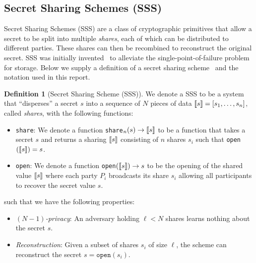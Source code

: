 \documentclass[11pt]{report}
\theoremstyle{definition}
\newtheorem{definition}{Definition}[section]
\theoremstyle{plain}
\begin{document}


\subsection{Secret Sharing Schemes (SSS)}

Secret Sharing Schemes (SSS) are a class of cryptographic primitives that allow a secret to be split into multiple \textit{shares}, each of which can be distributed to different parties. These shares can then be recombined to reconstruct the original secret. SSS was initially invented~\cite{shamir1979share} to alleviate the single-point-of-failure problem for storage. Below we supply a definition of a secret sharing scheme~\cite{cramer2015secure} and the notation used in this report.

\begin{definition}[Secret Sharing Scheme (SSS)]\label{def:ss-share}
  We denote a SSS to be a system that ``disperses'' a secret $s$ into a sequence of $N$ pieces of data $\llbracket s \rrbracket = [s_1, \dots, s_n]$, called \textit{shares}, with the following functions:
  \begin{itemize}
    \item \texttt{share}: We denote a function \texttt{share}$_n(s) \rightarrow \llbracket s \rrbracket$ to be a function that takes a secret $s$ and returns a sharing $\llbracket s \rrbracket$ consisting of $n$ shares $s_i$ such that \texttt{open}$(\llbracket s \rrbracket) = s$.
    \item \texttt{open}: We denote a function \texttt{open}$(\llbracket s \rrbracket) \rightarrow s$ to be the opening of the shared value $\llbracket s \rrbracket$ where each party $P_i$ broadcasts its share $s_i$ allowing all participants to recover the secret value $s$.
  \end{itemize}
  such that we have the following properties:
  \begin{itemize}[parsep=0pt, itemsep=0pt]
    \item \textit{$(N-1)$-privacy}: An adversary holding $\ell < N$ shares learns nothing about the secret $s$.
    \item \textit{Reconstruction}: Given a subset of shares $s_i$ of size $\ell$, the scheme can reconstruct the secret $s = \texttt{open}(s_i)$.
  \end{itemize}
\end{definition}
\end{document}
